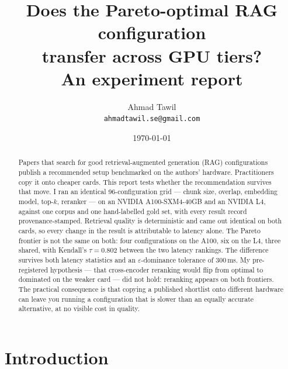 \newcommand{\hs}[1]{{\small\ttfamily #1}}
\lstset{basicstyle=\footnotesize\ttfamily, frame=single, framesep=3pt,
        breaklines=true, columns=fullflexible,
        xleftmargin=3.4pt, xrightmargin=3.4pt,
        aboveskip=7pt, belowskip=7pt}
\captionsetup{font=small,labelfont=bf}
\setlength{\parskip}{0.3em}

\title{\bfseries Does the Pareto-optimal RAG configuration\\transfer across GPU tiers?\\[4pt]
       \large\normalfont An experiment report}
\author{Ahmad Tawil\\\small\texttt{ahmadtawil.se@gmail.com}}
\date{\today}


\maketitle

\begin{abstract}
\noindent
Papers that search for good retrieval-augmented generation (RAG) configurations
publish a recommended setup benchmarked on the authors' hardware. Practitioners
copy it onto cheaper cards. This report tests whether the recommendation
survives that move. I ran an identical 96-configuration grid --- chunk size,
overlap, embedding model, top-$k$, reranker --- on an NVIDIA A100-SXM4-40GB and
an NVIDIA L4, against one corpus and one hand-labelled gold set, with every
result record provenance-stamped. Retrieval quality is deterministic and came
out identical on both cards, so every change in the result is attributable to
latency alone. The Pareto frontier is not the same on both: four configurations
on the A100, six on the L4, three shared, with Kendall's $\tau = 0.802$ between
the two latency rankings. The difference survives both latency statistics and an
$\varepsilon$-dominance tolerance of 300\,ms. My pre-registered hypothesis --- that
cross-encoder reranking would flip from optimal to dominated on the weaker card
--- did not hold: reranking appears on both frontiers. The practical
consequence is that copying a published shortlist onto different hardware can
leave you running a configuration that is slower than an equally accurate
alternative, at no visible cost in quality.
\end{abstract}

\section{Introduction}

